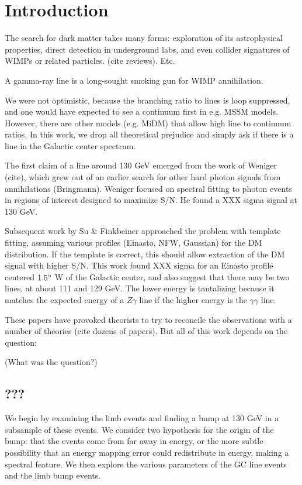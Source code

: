 \documentclass[aps,twocolumn,prd,superscriptaddress,showpacs,nofootinbib,fixfloat]{revtex4}
\newcommand{\degree}{^{\rm o}}
\begin{document}
\section{Introduction}
The search for dark matter takes many forms:  exploration of its astrophysical
properties, direct detection in underground labs, and even collider signatures
of WIMPs or related particles.  (cite reviews).   Etc. 

A gamma-ray line is a long-sought smoking gun for WIMP annihilation. 

We were not optimistic, because the branching ratio to lines is loop
suppressed, and one would have expected to see a continuum first in e.g. MSSM
models.  However, there are other models (e.g. MiDM) that allow high line to
continuum ratios.  In this work, we drop all theoretical prejudice and simply
ask if there is a line in the Galactic center spectrum. 

The first claim of a line around 130 GeV emerged from the work of Weniger
(cite), which grew out of an earlier search for other hard photon signals from
annihilations (Bringmann).  Weniger focused on spectral fitting to photon
events in regions of interest designed to maximize S/N.  He found a XXX sigma
signal at 130 GeV. 

Subsequent work by Su \& Finkbeiner approached the problem with template
fitting, assuming various profiles (Einasto, NFW, Gaussian) for the DM
distribution.  If the template is correct, this should allow extraction of the
DM signal with higher S/N.   This work found XXX sigma for an Einasto profile
centered $1.5\degree$ W of the Galactic center, and also suggest that there
may be two lines, at about 111 and 129 GeV.  The lower energy is tantalizing
because it matches the expected energy of a $Z\gamma$ line if the higher
energy is the $\gamma\gamma$ line. 

These papers have provoked theorists to try to reconcile the observations with
a number of theories (cite dozens of papers).  But all of this work depends on
the question:

(What was the question?)

\subsection{???}
We begin by examining the limb events and finding a bump at 130 GeV in a
subsample of these events.  We consider two hypothesis for the origin of the
bump: that the events come from far away in energy, or the more subtle
possibility that an energy mapping error could redistribute in energy, making
a spectral feature.  We then explore the various parameters of the GC line
events and the limb bump events. 
\end{document}
